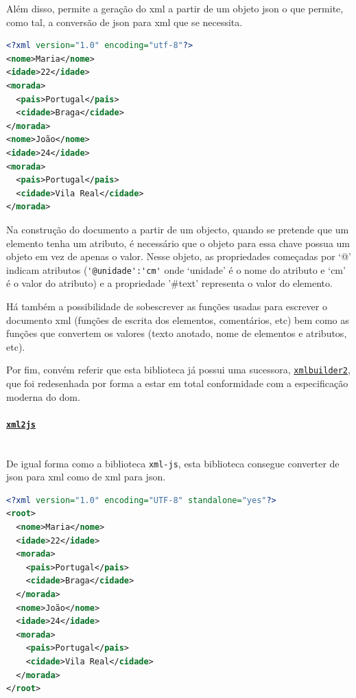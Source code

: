 Além disso, permite a geração do \acrshort{xml} a partir de um objeto \acrshort{json} o que permite, como tal, a conversão de \acrshort{json} para \acrshort{xml} que se necessita.

\begin{lstlisting}[language=xml, caption=Resultado da conversão do exemplo~\ref{exem:jsonBib} usando o conversor \texttt{xmlbuilder}]
<?xml version="1.0" encoding="utf-8"?>
<nome>Maria</nome>
<idade>22</idade>
<morada>
  <pais>Portugal</pais>
  <cidade>Braga</cidade>
</morada>
<nome>João</nome>
<idade>24</idade>
<morada>
  <pais>Portugal</pais>
  <cidade>Vila Real</cidade>
</morada>
\end{lstlisting}

Na construção do documento a partir de um objecto, quando se pretende que um elemento tenha um atributo, é necessário que o objeto para essa chave possua um objeto em vez de apenas o valor. Nesse objeto, as propriedades começadas por `@' indicam atributos (\verb|'@unidade':'cm'| onde `unidade' é o nome do atributo e `cm' é o valor do atributo) e a propriedade '\#text' representa o valor do elemento.

Há também a possibilidade de sobescrever as funções usadas para escrever o documento \acrshort{xml} (funções de escrita dos elementos, comentários, etc) bem como as funções que convertem os valores (texto anotado, nome de elementos e atributos, etc).

Por fim, convém referir que esta biblioteca já possui uma sucessora, \href{https://www.npmjs.com/package/xmlbuilder2}{\texttt{xmlbuilder2}}, que foi redesenhada por forma a estar em total conformidade com a especificação moderna do \acrshort{dom}.

\paragraph{\href{https://www.npmjs.com/package/xml2js}{\texttt{xml2js}}} \mbox{} \\

De igual forma como a biblioteca \texttt{xml-js}, esta biblioteca consegue converter de \acrshort{json} para \acrshort{xml} como de \acrshort{xml} para \acrshort{json}. 

\begin{lstlisting}[language=xml, caption=Resultado da conversão do exemplo~\ref{exem:jsonBib} usando o conversor \texttt{xml2js}]
<?xml version="1.0" encoding="UTF-8" standalone="yes"?>
<root>
  <nome>Maria</nome>
  <idade>22</idade>
  <morada>
    <pais>Portugal</pais>
    <cidade>Braga</cidade>
  </morada>
  <nome>João</nome>
  <idade>24</idade>
  <morada>
    <pais>Portugal</pais>
    <cidade>Vila Real</cidade>
  </morada>
</root>
\end{lstlisting}

